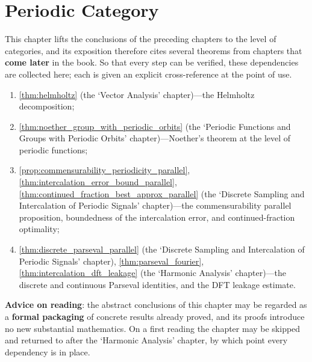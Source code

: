 \chapter{Periodic Category}

\begin{remark}\label{rem:periodic_category_dependencies}
This chapter lifts the conclusions of the preceding chapters to the level of categories, and its exposition therefore cites several theorems from chapters that \textbf{come later} in the book. So that every step can be verified, these dependencies are collected here; each is given an explicit cross-reference at the point of use.
\begin{enumerate}[label=(\roman*)]
    \item \cref{thm:helmholtz} (the `Vector Analysis' chapter)---the Helmholtz decomposition;
    \item \cref{thm:noether_group_with_periodic_orbits} (the `Periodic Functions and Groups with Periodic Orbits' chapter)---Noether's theorem at the level of periodic functions;
    \item \cref{prop:commensurability_periodicity_parallel}, \cref{thm:intercalation_error_bound_parallel}, \cref{thm:continued_fraction_best_approx_parallel} (the `Discrete Sampling and Intercalation of Periodic Signals' chapter)---the commensurability parallel proposition, boundedness of the intercalation error, and continued-fraction optimality;
    \item \cref{thm:discrete_parseval_parallel} (the `Discrete Sampling and Intercalation of Periodic Signals' chapter), \cref{thm:parseval_fourier}, \cref{thm:intercalation_dft_leakage} (the `Harmonic Analysis' chapter)---the discrete and continuous Parseval identities, and the DFT leakage estimate.
\end{enumerate}
\textbf{Advice on reading}: the abstract conclusions of this chapter may be regarded as a \textbf{formal packaging} of concrete results already proved, and its proofs introduce no new substantial mathematics. On a first reading the chapter may be skipped and returned to after the `Harmonic Analysis' chapter, by which point every dependency is in place.
\end{remark}

